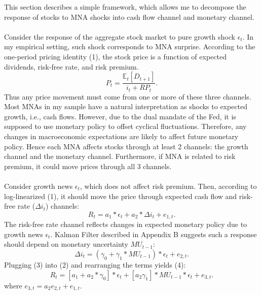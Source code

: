 \documentclass[12pt]{article}
\begin{document}
This section describes a simple framework, which allows me to decompose the response of stocks to MNA shocks into cash flow channel and monetary channel.
\paragraph{}
Consider the response of the aggregate stock market to pure growth shock $\epsilon_t$. In my empirical setting, such shock corresponds to MNA surprise. According to the one-period pricing identity (1), the stock price is a function of expected dividends, risk-free rate, and risk premium.
\begin{equation}
    P_t = \frac{\mathbb{E}_t[D_{t+1}]}{i_t + RP_t}.
\end{equation}
Thus any price movement must come from one or more of these three channels. Most MNAs in my sample have a natural interpretation as shocks to expected growth, i.e., cash flows. However, due to the dual mandate of the Fed, it is supposed to use monetary policy to offset cyclical fluctuations. Therefore, any changes in macroeconomic expectations are likely to affect future monetary policy. Hence each MNA affects stocks through at least 2 channels: the growth channel and the monetary channel. Furthermore, if MNA is related to risk premium, it could move prices through all 3 channels. 
\paragraph{}
Consider growth news $\epsilon_t$, which does not affect risk premium. Then, according to log-linearized (1), it should move the price through expected cash flow and risk-free rate ($\Delta i_t$) channels:
\begin{equation}
    R_t = a_1*\epsilon_t + a_2*\Delta i_t + e_{1,t}.
\end{equation}
The risk-free rate channel reflects changes in expected monetary policy due to growth news $\epsilon_t$. Kalman Filter described in Appendix B suggests such a response should depend on monetary uncertainty $MU_{t-1}$:
\begin{equation}
    \Delta i_t = (\gamma_0 + \gamma_1*MU_{t-1})*\epsilon_t + e_{2,t}.
\end{equation}
Plugging (3) into (2) and rearranging the terms yields (4):
\begin{equation}
    R_t = [a_1+a_2*\gamma_0]*\epsilon_t + [a_2\gamma_1]*MU_{t-1}*\epsilon_t + e_{3,t}.
\end{equation}
where $e_{3,t} = a_2e_{2,t}+e_{1,t}.$ 
\end{document}
